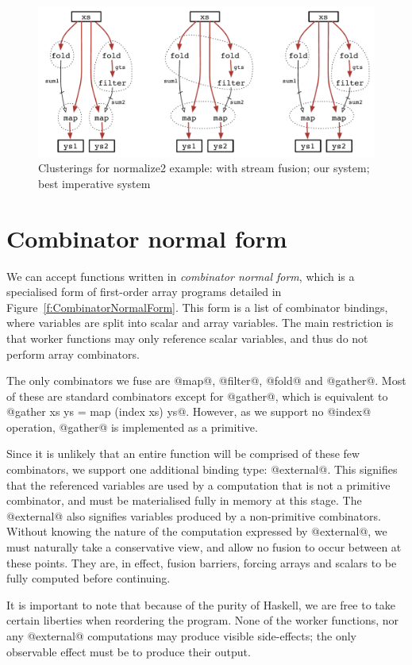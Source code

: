 
\begin{figure}[ht!]
\begin{center}
\includegraphics[scale=0.5]{figures/ex1-compare.pdf}
\end{center}

\caption{Clusterings for normalize2 example: with stream fusion; our system; best imperative system}
\label{f:normalize2-cluterings}
\end{figure}


\section{Combinator normal form}
We can accept functions written in \emph{combinator normal form}, which is a specialised form of first-order array programs detailed in Figure~\ref{f:CombinatorNormalForm}.
This form is a list of combinator bindings, where variables are split into scalar and array variables.
The main restriction is that worker functions may only reference scalar variables, and thus do not perform array combinators.

The only combinators we fuse are @map@, @filter@, @fold@ and @gather@.
Most of these are standard combinators except for @gather@, which is equivalent to @gather xs ys = map (index xs) ys@.
However, as we support no @index@ operation, @gather@ is implemented as a primitive.

Since it is unlikely that an entire function will be comprised of these few combinators, we support one additional binding type: @external@. This signifies that the referenced variables are used by a computation that is not a primitive combinator, and must be materialised fully in memory at this stage.
The @external@ also signifies variables produced by a non-primitive combinators.
Without knowing the nature of the computation expressed by @external@, we must naturally take a conservative view, and allow no fusion to occur between at these points. They are, in effect, fusion barriers, forcing arrays and scalars to be fully computed before continuing.

It is important to note that because of the purity of Haskell, we are free to take certain liberties when reordering the program.
None of the worker functions, nor any @external@ computations may produce visible side-effects; the only observable effect must be to produce their output.



